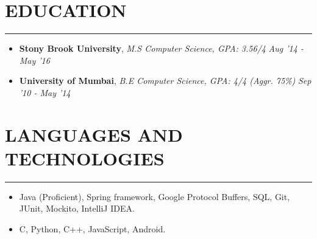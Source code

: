 \documentclass[12pt]{article}
\newcommand{\sectionHeading}[1]{
\vspace{-15pt}
\section*{\small{#1}}
\vspace{-10pt}
\hrule
\vspace{8pt}
}
\newcommand {\extracurricularSectionSubheading}[3]{
    \noindent \small{\textbf{#1} : #2 \hfill \textit{#3}} \\
    \vspace{-10pt}
}
\newcommand{\sectionListStart}{
    \begin{itemize}[label={\small{\textbullet}}, leftmargin=20pt] %
}
\newcommand{\sectionListStartNoBullet}{
    \begin{itemize}[label={}, leftmargin=0pt] %
}
\newcommand{\sectionListEnd}{\end{itemize} \vspace{0pt}}
\newcommand{\sectionListItem}[1]{\item \small{#1}}
\newcommand{\eduListItemWithDate}[3]{\item \small{\textbf{#1}, \textit{#2} \hfill \textit{#3}} \vspace{5pt}}
\begin{document}





\sectionHeading{EDUCATION}
\sectionListStartNoBullet
\eduListItemWithDate
{Stony Brook  University}{M.S Computer Science, GPA: 3.56/4}{Aug '14 - May '16}

\eduListItemWithDate
{University of Mumbai}{B.E Computer Science, GPA: 4/4 (Aggr. 75\%)}{Sep '10 - May '14}
\sectionListEnd
\sectionHeading{LANGUAGES AND TECHNOLOGIES}
\sectionListStart
    \sectionListItem
        Java (Proficient), Spring framework, Google Protocol Buffers, SQL, Git, JUnit, Mockito, IntelliJ IDEA.
    \sectionListItem
        C, Python, C++, JavaScript, Android. 
\sectionListEnd

\end{document}
